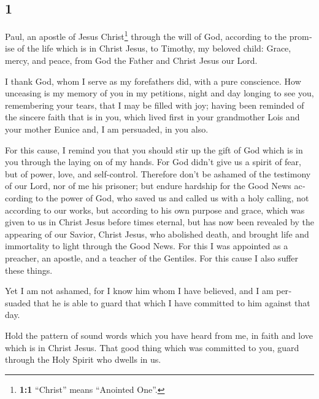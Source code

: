 \begin{paracol}{2}
\switchcolumn
\begin{otherlanguage}{english}

\hypertarget{section-1}{%
\section{1}\label{section-1}}

 Paul, an apostle of Jesus Christ\footnote{\textbf{1:1}
  ``Christ'' means ``Anointed One''.} through the will of God, according
to the promise of the life which is in Christ Jesus,  to
Timothy, my beloved child: Grace, mercy, and peace, from God the Father
and Christ Jesus our Lord.

 I thank God, whom I serve as my forefathers did, with a
pure conscience. How unceasing is my memory of you in my petitions,
night and day  longing to see you, remembering your tears,
that I may be filled with joy;  having been reminded of
the sincere faith that is in you, which lived first in your grandmother
Lois and your mother Eunice and, I am persuaded, in you also.

 For this cause, I remind you that you should stir up the
gift of God which is in you through the laying on of my hands.
 For God didn't give us a spirit of fear, but of power,
love, and self-control.  Therefore don't be ashamed of the
testimony of our Lord, nor of me his prisoner; but endure hardship for
the Good News according to the power of God,  who saved us
and called us with a holy calling, not according to our works, but
according to his own purpose and grace, which was given to us in Christ
Jesus before times eternal,  but has now been revealed by
the appearing of our Savior, Christ Jesus, who abolished death, and
brought life and immortality to light through the Good News.
 For this I was appointed as a preacher, an apostle, and
a teacher of the Gentiles.  For this cause I also suffer
these things.

Yet I am not ashamed, for I know him whom I have believed, and I am
persuaded that he is able to guard that which I have committed to him
against that day.

 Hold the pattern of sound words which you have heard
from me, in faith and love which is in Christ Jesus. 
That good thing which was committed to you, guard through the Holy
Spirit who dwells in us.


\end{otherlanguage}
\end{paracol}
